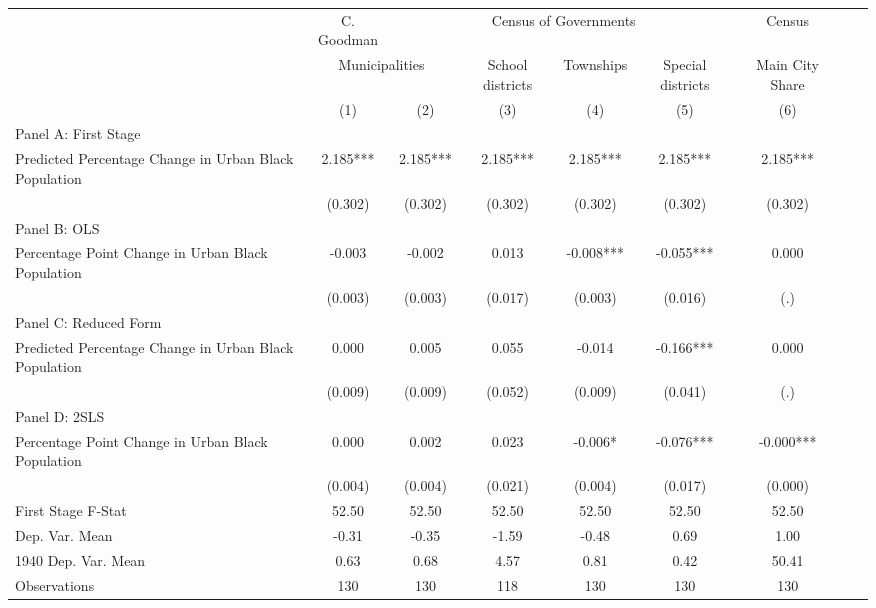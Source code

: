  \begin{tabular}{l*{8}{c}} \toprule
&\multicolumn{1}{c}{C. Goodman}&\multicolumn{4}{c}{Census of Governments}&\multicolumn{1}{c}{Census}\\\cmidrule(lr){2-2}\cmidrule(lr){3-6}\cmidrule(lr){7-7}
&\multicolumn{2}{c}{Municipalities}&\multicolumn{1}{c}{School districts}&\multicolumn{1}{c}{Townships}&\multicolumn{1}{c}{Special districts}&\multicolumn{1}{c}{Main City Share}\\\cmidrule(lr){2-3}\cmidrule(lr){4-6}\cmidrule(lr){7-7}
&\multicolumn{1}{c}{(1)}&\multicolumn{1}{c}{(2)}&\multicolumn{1}{c}{(3)}&\multicolumn{1}{c}{(4)}&\multicolumn{1}{c}{(5)}&\multicolumn{1}{c}{(6)}\\
\cmidrule(lr){1-7}
\multicolumn{6}{l}{Panel A: First Stage}\\
\cmidrule(lr){1-7}
Predicted Percentage Change in Urban Black Population&    2.185***&    2.185***&    2.185***&    2.185***&    2.185***&    2.185***\\
                &  (0.302)   &  (0.302)   &  (0.302)   &  (0.302)   &  (0.302)   &  (0.302)   \\
\cmidrule(lr){1-7}
\multicolumn{6}{l}{Panel B: OLS}\\
\cmidrule(lr){1-7}
Percentage Point Change in Urban Black Population&   -0.003   &   -0.002   &    0.013   &   -0.008***&   -0.055***&    0.000   \\
                &  (0.003)   &  (0.003)   &  (0.017)   &  (0.003)   &  (0.016)   &      (.)   \\
\cmidrule(lr){1-7}
\multicolumn{6}{l}{Panel C: Reduced Form}\\
\cmidrule(lr){1-7}
Predicted Percentage Change in Urban Black Population&    0.000   &    0.005   &    0.055   &   -0.014   &   -0.166***&    0.000   \\
                &  (0.009)   &  (0.009)   &  (0.052)   &  (0.009)   &  (0.041)   &      (.)   \\
\cmidrule(lr){1-7}
\multicolumn{6}{l}{Panel D: 2SLS}\\
\cmidrule(lr){1-7}
Percentage Point Change in Urban Black Population&    0.000   &    0.002   &    0.023   &   -0.006*  &   -0.076***&   -0.000***\\
                &  (0.004)   &  (0.004)   &  (0.021)   &  (0.004)   &  (0.017)   &  (0.000)   \\
\midrule
First Stage F-Stat&    52.50   &    52.50   &    52.50   &    52.50   &    52.50   &    52.50   \\
Dep. Var. Mean  &    -0.31   &    -0.35   &    -1.59   &    -0.48   &     0.69   &     1.00   \\
1940 Dep. Var. Mean&     0.63   &     0.68   &     4.57   &     0.81   &     0.42   &    50.41   \\
Observations    &      130   &      130   &      118   &      130   &      130   &      130   \\
 \bottomrule \end{tabular}
